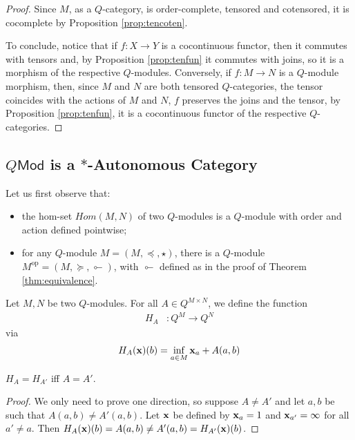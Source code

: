 \begin{proof}
Since $M$, as a $Q$-category, is order-complete, tensored and cotensored, it is cocomplete by Proposition \ref{prop:tencoten}.


To conclude, notice that if $f:X\to Y$ is a cocontinuous functor, then it commutes with tensors and, by 
Proposition \ref{prop:tenfun} it commutes with joins, so it is a morphism of the respective $Q$-modules. Conversely, if $f:M\to N$ is a $Q$-module morphism, then, since $M$ and $N$ are both tensored $Q$-categories, the tensor coincides with the actions of $M$ and $N$, $f$ preserves the joins and the tensor, by Proposition \ref{prop:tenfun}, it is a cocontinuous functor of the respective $Q$-categories.
\end{proof}


\subsection{$Q\mathsf{Mod}$ is a $*$-Autonomous Category}



Let us first observe that:
\begin{itemize}
\item the hom-set $Hom(M,N)$ of two $Q$-modules is a $Q$-module with order and action defined pointwise;

\item for any $Q$-module $M=(M,\preceq, \star)$, there is a $Q$-module
$M^{\mathrm{op}}=(M,\succeq, \multimapinv)$, with $\multimapinv$ defined as in the proof of Theorem \ref{thm:equivalence}.


\end{itemize}



Let $M,N$ be two $Q$-modules. For all $A\in Q^{M\times N}$, we define the function
\begin{align*}
H_{A} & : Q^{M} \longrightarrow Q^{N}%
\end{align*}
via
\begin{align*}
H_{A}(\mathbf{x})(b)  &= \inf_{a\in M}\mathbf{x}_{a}+A(a,b)\\
\end{align*}


\begin{lemma}
$H_{A}=H_{A'}$ iff $A=A'$. 
\end{lemma}
\begin{proof}
We only need to prove one direction, so suppose $A\neq A'$ and let $a,b$ be such that $A(a,b)\neq A'(a,b)$.
Let $\mathbf{x}$ be defined by $\mathbf{x}_{a}=1$ and $\mathbf{x}_{a'}=\infty$ for all $a'\neq a$. Then $H_{A}(\mathbf{x})(b)=A(a,b)\neq A'(a,b)=H_{A'}(\mathbf{x})(b)$. 
\end{proof}

